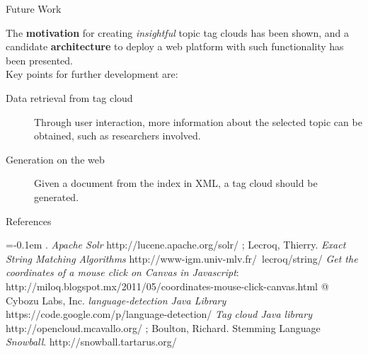 \documentclass[a0paper, portrait]{baposter}
\begin{document}
\begin{poster}
  
  \begin{posterbox}[column=2, name=future, below=interact] {Future Work} {
    The {\bf motivation} for creating {\em insightful} topic tag clouds has been shown, and a candidate {\bf architecture} to deploy a web platform with such functionality has been presented.  \\ %
    Key points for further development are:
    \begin{description}
      \item[Data retrieval from tag cloud] Through user interaction, more information about the selected topic can be obtained, such as researchers involved.
      \item[Generation on the web] Given a document from the index in XML, a tag cloud should be generated.
    \end{description}
  }
  \end{posterbox}
  
  \begin{posterbox}[column=2, name=ref, below=future] {References} {
      \small {
      \begin{flushleft}
        
        \renewcommand{\section}[2]{\vskip 0.05em}
        \begin{thebibliography}{7}\itemsep=-0.1em 
          \setlength{\baselineskip}{0.4em}
            . {\it Apache Solr} 
            \newblock http://lucene.apache.org/solr/  
            ; {\sc Lecroq, Thierry}. {\it Exact String Matching Algorithms}  
            \newblock http://www-igm.univ-mlv.fr/~lecroq/string/      
             {\it Get the coordinates of a mouse click on Canvas in Javascript}:
            \newblock http://miloq.blogspot.mx/2011/05/coordinates-mouse-click-canvas.html
             @ Cybozu Labs, Inc. {\it language-detection Java Library} 
            \newblock https://code.google.com/p/language-detection/
             {\it Tag cloud Java library} 
            \newblock http://opencloud.mcavallo.org/ 
            ; {\sc Boulton, Richard}. Stemming Language {\em Snowball}. 
            \newblock http://snowball.tartarus.org/
        \end{thebibliography}
        \vspace{0.3em}       
      \end{flushleft}
      }
    }
  \end{posterbox}

\end{poster}
\end{document}
